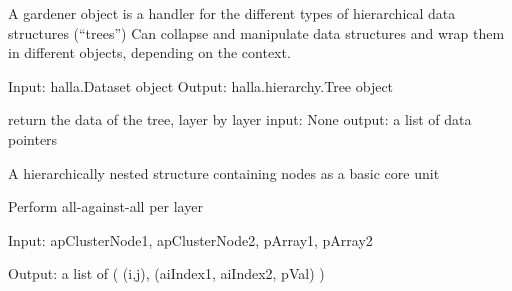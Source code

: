 \documentclass[letterpaper,10pt,english]{sphinxmanual}
\begin{document}
\begin{fulllineitems}
\label{index:halla.hierarchy.Gardener}
A gardener object is a handler for the different types of hierarchical data structures (``trees'')
Can collapse and manipulate data structures and wrap them in different objects, depending on the 
context.

\begin{fulllineitems}
\label{index:halla.hierarchy.Gardener.PlantTree}
Input: halla.Dataset object 
Output: halla.hierarchy.Tree object

\end{fulllineitems}


\begin{fulllineitems}
\label{index:halla.hierarchy.Gardener.next}
return the data of the tree, layer by layer
input: None 
output: a list of data pointers

\end{fulllineitems}


\end{fulllineitems}


\begin{fulllineitems}
\label{index:halla.hierarchy.Tree}
A hierarchically nested structure containing nodes as
a basic core unit

\end{fulllineitems}


\begin{fulllineitems}
\label{index:halla.hierarchy.all_against_all}
Perform all-against-all per layer

Input: apClusterNode1, apClusterNode2, pArray1, pArray2

Output: a list of ( (i,j), (aiIndex1, aiIndex2, pVal) )

\end{fulllineitems}
\end{document}

